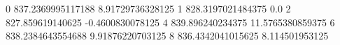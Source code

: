 0 837.2369995117188 8.91729736328125
1 828.3197021484375 0.0
2 827.859619140625 -0.4600830078125
4 839.896240234375 11.5765380859375
6 838.2384643554688 9.91876220703125
8 836.4342041015625 8.114501953125

